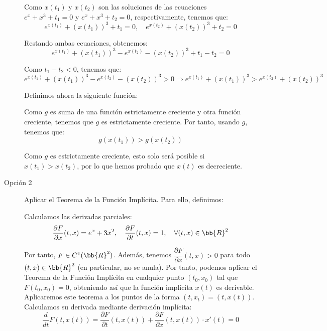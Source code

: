 \documentclass[12pt]{article}
\begin{document}
\begin{ejercicio}
\begin{description}
            Como $x(t_1)$ y $x(t_2)$ son las soluciones de las ecuaciones $e^x + x^3 + t_1 = 0$ y $e^x + x^3 + t_2 = 0$, respectivamente, tenemos que:
            \begin{equation*}
                e^{x(t_1)} + (x(t_1))^3 + t_1 = 0, \quad e^{x(t_2)} + (x(t_2))^3 + t_2 = 0
            \end{equation*}

            Restando ambas ecuaciones, obtenemos:
            \begin{equation*}
                e^{x(t_1)} + (x(t_1))^3 - e^{x(t_2)} - (x(t_2))^3 + t_1 - t_2 = 0
            \end{equation*}

            Como $t_1-t_2 < 0$, tenemos que:
            \begin{equation*}
                e^{x(t_1)} + (x(t_1))^3 - e^{x(t_2)} - (x(t_2))^3 > 0 \Longrightarrow
                e^{x(t_1)} + (x(t_1))^3 > e^{x(t_2)} + (x(t_2))^3
            \end{equation*}

            Definimos ahora la siguiente función:

            Como $g$ es suma de una función estrictamente creciente y otra función creciente, tenemos que $g$ es estrictamente creciente. Por tanto, usando $g$, tenemos que:
            \begin{equation*}
                g(x(t_1)) > g(x(t_2))
            \end{equation*}

            Como $g$ es estrictamente creciente, esto solo será posible si $x(t_1) > x(t_2)$, por lo que hemos probado que $x(t)$ es decreciente.

            \item[Opción 2] Aplicar el Teorema de la Función Implícita. Para ello, definimos:

            Calculamos las derivadas parciales:
            \begin{equation*}
                \dfrac{\partial F}{\partial x}(t,x) = e^x + 3x^2, \quad \dfrac{\partial F}{\partial t}(t,x) = 1, \quad \forall (t,x)\in\bb{R}^2
            \end{equation*}

            Por tanto, $F\in C^1(\bb{R}^2)$. Además, tenemos $\dfrac{\partial F}{\partial x} (t, x) > 0$ para todo $(t, x)\in\bb{R}^2$ (en particular, no se anula). Por tanto, podemos aplicar el Teorema de la Función Implícita en cualquier punto $(t_0, x_0)$ tal que $F(t_0, x_0) = 0$,
            obteniendo así que la función implícita $x(t)$ es derivable. Aplicaremos este teorema a los puntos de la forma $(t,x_t)=(t,x(t))$. Calculamos su derivada mediante derivación implícita:
            \begin{equation*}
                \dfrac{d}{dt} F(t, x(t)) = \dfrac{\partial F}{\partial t}(t, x(t)) + \dfrac{\partial F}{\partial x}(t, x(t))\cdot x'(t) = 0
            \end{equation*}


\end{description}
\end{ejercicio}
\end{document}
